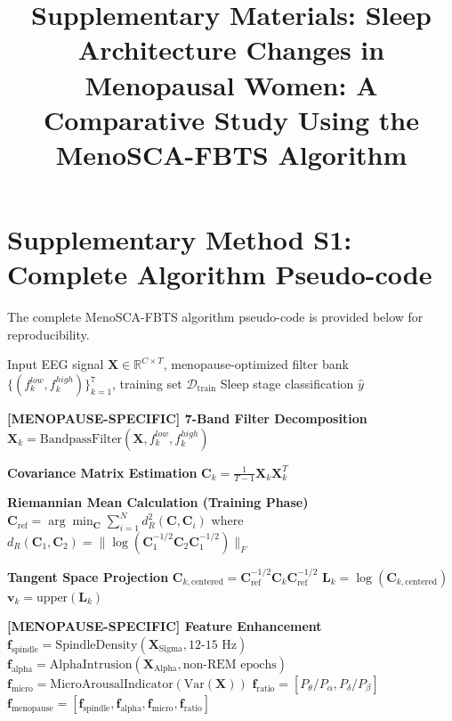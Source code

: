 \documentclass[ASNA,twocolumn]{USG}
\begin{document}
\title{Supplementary Materials: Sleep Architecture Changes in Menopausal Women: A Comparative Study Using the MenoSCA-FBTS Algorithm}

\maketitle

\section*{Supplementary Method S1: Complete Algorithm Pseudo-code}

The complete MenoSCA-FBTS algorithm pseudo-code is provided below for reproducibility.

\begin{algorithm}[!ht]
\caption{MenoSCA-FBTS Algorithm with Menopause-Specific Adaptations}
\begin{algorithmic}[1]
\Require Input EEG signal $\mathbf{X} \in \mathbb{R}^{C \times T}$, menopause-optimized filter bank $\{(f_k^{low}, f_k^{high})\}_{k=1}^{7}$, training set $\mathcal{D}_{\text{train}}$
\Ensure Sleep stage classification $\hat{y}$

\State \textbf{[MENOPAUSE-SPECIFIC] 7-Band Filter Decomposition}
    \State $\mathbf{X}_k = \text{BandpassFilter}(\mathbf{X}, f_k^{low}, f_k^{high})$
\EndFor

\State \textbf{Covariance Matrix Estimation}
    \State $\mathbf{C}_k = \frac{1}{T-1} \mathbf{X}_k \mathbf{X}_k^T$
\EndFor

\State \textbf{Riemannian Mean Calculation (Training Phase)}
\State $\mathbf{C}_{\text{ref}} = \arg\min_{\mathbf{C}} \sum_{i=1}^{N} d_R^2(\mathbf{C}, \mathbf{C}_i)$
\State where $d_R(\mathbf{C}_1, \mathbf{C}_2) = \|\log(\mathbf{C}_1^{-1/2} \mathbf{C}_2 \mathbf{C}_1^{-1/2})\|_F$

\State \textbf{Tangent Space Projection}
    \State $\mathbf{C}_{k,\text{centered}} = \mathbf{C}_{\text{ref}}^{-1/2} \mathbf{C}_k \mathbf{C}_{\text{ref}}^{-1/2}$
    \State $\mathbf{L}_k = \log(\mathbf{C}_{k,\text{centered}})$
    \State $\mathbf{v}_k = \text{upper}(\mathbf{L}_k)$
\EndFor

\State \textbf{[MENOPAUSE-SPECIFIC] Feature Enhancement}
\State $\mathbf{f}_{\text{spindle}} = \text{SpindleDensity}(\mathbf{X}_{\text{Sigma}}, 12\text{-}15\text{ Hz})$
\State $\mathbf{f}_{\text{alpha}} = \text{AlphaIntrusion}(\mathbf{X}_{\text{Alpha}}, \text{non-REM epochs})$
\State $\mathbf{f}_{\text{micro}} = \text{MicroArousalIndicator}(\text{Var}(\mathbf{X}))$
\State $\mathbf{f}_{\text{ratio}} = [P_{\theta}/P_{\alpha}, P_{\delta}/P_{\beta}]$
\State $\mathbf{f}_{\text{menopause}} = [\mathbf{f}_{\text{spindle}}, \mathbf{f}_{\text{alpha}}, \mathbf{f}_{\text{micro}}, \mathbf{f}_{\text{ratio}}]$


\end{algorithmic}
\end{algorithm}
\end{document}

